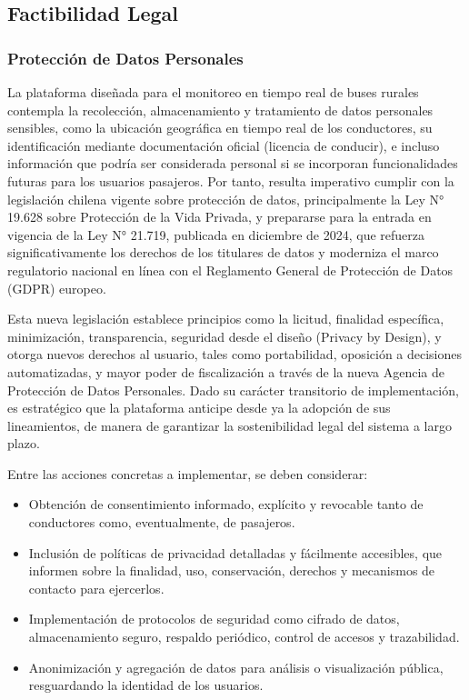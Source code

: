 \documentclass[12pt]{article}
\begin{document}
\newpage
\subsection{Factibilidad Legal}
\subsubsection{Protección de Datos Personales}

La plataforma diseñada para el monitoreo en tiempo real de buses rurales contempla la recolección, almacenamiento y tratamiento de datos personales sensibles, como la ubicación geográfica en tiempo real de los conductores, su identificación mediante documentación oficial (licencia de conducir), e incluso información que podría ser considerada personal si se incorporan funcionalidades futuras para los usuarios pasajeros. Por tanto, resulta imperativo cumplir con la legislación chilena vigente sobre protección de datos, principalmente la Ley N° 19.628 sobre Protección de la Vida Privada, y prepararse para la entrada en vigencia de la Ley N° 21.719, publicada en diciembre de 2024, que refuerza significativamente los derechos de los titulares de datos y moderniza el marco regulatorio nacional en línea con el Reglamento General de Protección de Datos (GDPR) europeo.

Esta nueva legislación establece principios como la licitud, finalidad específica, minimización, transparencia, seguridad desde el diseño (Privacy by Design), y otorga nuevos derechos al usuario, tales como portabilidad, oposición a decisiones automatizadas, y mayor poder de fiscalización a través de la nueva Agencia de Protección de Datos Personales. Dado su carácter transitorio de implementación, es estratégico que la plataforma anticipe desde ya la adopción de sus lineamientos, de manera de garantizar la sostenibilidad legal del sistema a largo plazo.

Entre las acciones concretas a implementar, se deben considerar:

\begin{itemize}
    \item Obtención de consentimiento informado, explícito y revocable tanto de conductores como, eventualmente, de pasajeros.
    \item Inclusión de políticas de privacidad detalladas y fácilmente accesibles, que informen sobre la finalidad, uso, conservación, derechos y mecanismos de contacto para ejercerlos.
    \item Implementación de protocolos de seguridad como cifrado de datos, almacenamiento seguro, respaldo periódico, control de accesos y trazabilidad.
    \item Anonimización y agregación de datos para análisis o visualización pública, resguardando la identidad de los usuarios.\\
\end{itemize}
\end{document}
